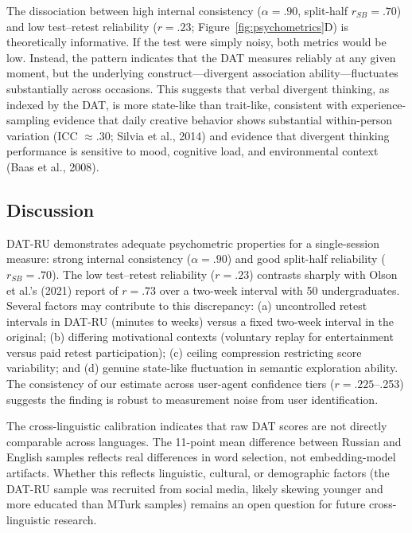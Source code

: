 \documentclass[12pt]{article}
\begin{document}
The dissociation between high internal consistency ($\alpha = .90$, split-half $r_{SB} = .70$) and low test--retest reliability ($r = .23$; Figure~\ref{fig:psychometrics}D) is theoretically informative. If the test were simply noisy, both metrics would be low. Instead, the pattern indicates that the DAT measures reliably at any given moment, but the underlying construct---divergent association ability---fluctuates substantially across occasions. This suggests that verbal divergent thinking, as indexed by the DAT, is more state-like than trait-like, consistent with experience-sampling evidence that daily creative behavior shows substantial within-person variation (ICC $\approx .30$; Silvia et al., 2014) and evidence that divergent thinking performance is sensitive to mood, cognitive load, and environmental context (Baas et al., 2008).

\subsection{Discussion}

DAT-RU demonstrates adequate psychometric properties for a single-session measure: strong internal consistency ($\alpha = .90$) and good split-half reliability ($r_{SB} = .70$). The low test--retest reliability ($r = .23$) contrasts sharply with Olson et al.'s (2021) report of $r = .73$ over a two-week interval with 50 undergraduates. Several factors may contribute to this discrepancy: (a) uncontrolled retest intervals in DAT-RU (minutes to weeks) versus a fixed two-week interval in the original; (b) differing motivational contexts (voluntary replay for entertainment versus paid retest participation); (c) ceiling compression restricting score variability; and (d) genuine state-like fluctuation in semantic exploration ability. The consistency of our estimate across user-agent confidence tiers ($r = .225$--.253) suggests the finding is robust to measurement noise from user identification.

The cross-linguistic calibration indicates that raw DAT scores are not directly comparable across languages. The 11-point mean difference between Russian and English samples reflects real differences in word selection, not embedding-model artifacts. Whether this reflects linguistic, cultural, or demographic factors (the DAT-RU sample was recruited from social media, likely skewing younger and more educated than MTurk samples) remains an open question for future cross-linguistic research.

\end{document}
